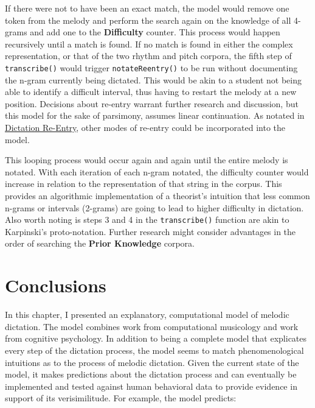 \documentclass[]{book}
\begin{document}
If there were not to have been an exact match, the model would remove one token from the melody and perform the search again on the knowledge of all 4-grams and add one to the \textbf{Difficulty} counter.
This process would happen recursively until a match is found.
If no match is found in either the complex representation, or that of the two rhythm and pitch corpora, the fifth step of \texttt{transcribe()} would trigger \texttt{notateReentry()} to be run without documenting the n-gram currently being dictated.
This would be akin to a student not being able to identify a difficult interval, thus having to restart the melody at a new position.
Decisions about re-entry warrant further research and discussion, but this model for the sake of parsimony, assumes linear continuation.
As notated in \protect\hyperlink{dictation-re-entry}{Dictation Re-Entry}, other modes of re-entry could be incorporated into the model.

This looping process would occur again and again until the entire melody is notated.
With each iteration of each n-gram notated, the difficulty counter would increase in relation to the representation of that string in the corpus.
This provides an algorithmic implementation of a theorist's intuition that less common n-grams or intervals (2-grams) are going to lead to higher difficulty in dictation.
Also worth noting is steps 3 and 4 in the \texttt{transcribe()} function are akin to Karpinski's proto-notation.
Further research might consider advantages in the order of searching the \textbf{Prior Knowledge} corpora.

\hypertarget{conclusions-2}{%
\section{Conclusions}\label{conclusions-2}}

In this chapter, I presented an explanatory, computational model of melodic dictation.
The model combines work from computational musicology and work from cognitive psychology.
In addition to being a complete model that explicates every step of the dictation process, the model seems to match phenomenological intuitions as to the process of melodic dictation.
Given the current state of the model, it makes predictions about the dictation process and can eventually be implemented and tested against human behavioral data to provide evidence in support of its verisimilitude.
For example, the model predicts:
\end{document}

